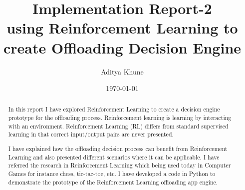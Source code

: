 \documentclass{article}
\begin{document}
\title{Implementation Report-2\\
using Reinforcement Learning to create Offloading Decision Engine}

\author{Aditya Khune}
\date{\today}  %
\maketitle


\tableofcontents


\begin{abstract}
In this report I have explored Reinforcement Learning to create a decision engine prototype for the offloading process. Reinforcement learning is learning by interacting with an environment. Reinforcement Learning (RL) differs from standard supervised learning in that correct input/output pairs are never presented. 
\par
I have explained how the offloading decision process can benefit from Reinforcement Learning and also presented different scenarios where it can be applicable. I have referred the research in Reinforcement Learning which being used today in Computer Games for instance chess, tic-tac-toe, etc. I have developed a code in Python to demonstrate the prototype of the Reinforcement Learning offloading app engine.
\end{abstract}

\end{document}

